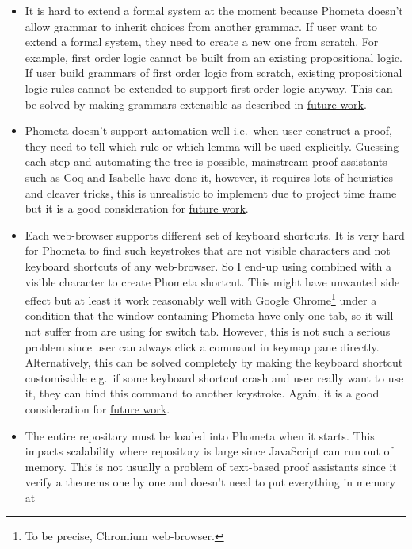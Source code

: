 \documentclass[master.tex]{subfiles}
\begin{document}
\newcommand{\hrefFutureWork}{\hyperref[sec:future_work]{future work}}

\begin{itemize}
\item It is hard to extend a formal system at the moment because Phometa doesn't
  allow grammar to inherit choices from another grammar. If user want to extend
  a formal system, they need to create a new one from scratch. For example,
  first order logic cannot be built from an existing propositional logic. If
  user build grammars of first order logic from scratch, existing propositional
  logic rules cannot be extended to support first order logic anyway. This can
  be solved by making grammars extensible as described in \hrefFutureWork.
\item Phometa doesn't support automation well i.e.\ when user construct a proof,
  they need to tell which rule or which lemma will be used explicitly. Guessing
  each step and automating the tree is possible, mainstream proof assistants
  such as Coq and Isabelle have done it, however, it requires lots of heuristics
  and cleaver tricks, this is unrealistic to implement due to project time
  frame but it is a good consideration for \hrefFutureWork.
\item Each web-browser supports different set of keyboard shortcuts. It is very
  hard for Phometa to find such keystrokes that are not visible characters and
  not keyboard shortcuts of any web-browser. So I end-up using 
  combined with a visible character to create Phometa shortcut. This might have
  unwanted side effect but at least it work reasonably well with Google
  Chrome\footnote{To be precise, Chromium web-browser.} under a condition that
  the window containing Phometa have only one tab, so it will not suffer from
   are using for switch tab. However, this is not such a
  serious problem since user can always click a command in keymap pane directly.
  Alternatively, this can be solved completely by making the keyboard shortcut
  customisable e.g.\ if some keyboard shortcut crash and user really want to use
  it, they can bind this command to another keystroke. Again, it is a good
  consideration for \hrefFutureWork.
\item The entire repository must be loaded into Phometa when it starts. This
  impacts scalability where repository is large since JavaScript can run out of
  memory. This is not usually a problem of text-based proof assistants since it
  verify a theorems one by one and doesn't need to put everything in memory at

\end{itemize}
\end{document}
